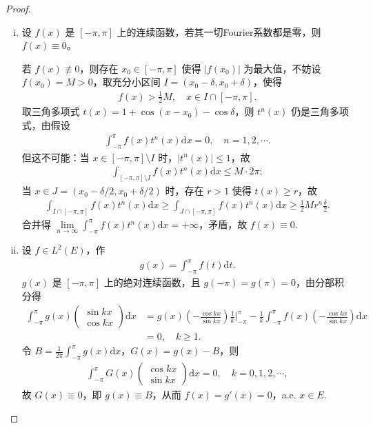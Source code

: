 \documentclass[../../main.tex]{subfiles}%
\begin{document}
\begin{proof}
\begin{enumerate}[(i)]
\item 设 $f(x)$ 是 $[-\pi, \pi]$ 上的连续函数，若其一切Fourier系数都是零，则 $f(x) \equiv 0$。

若 $f(x) \not\equiv 0$，则存在 $x_0 \in [-\pi, \pi]$ 使得 $|f(x_0)|$ 为最大值，不妨设 $f(x_0) = M > 0$，取充分小区间 $I = (x_0 - \delta, x_0 + \delta)$，使得
\begin{align*}
f(x) > \frac{1}{2}M, \quad x \in I \cap [-\pi, \pi].
\end{align*}
取三角多项式 $t(x) = 1 + \cos(x - x_0) - \cos\delta$，则 $t^n(x)$ 仍是三角多项式，由假设
\begin{align*}
\int_{-\pi}^\pi f(x) t^n(x) \mathrm{d}x = 0, \quad n=1,2,\cdots.
\end{align*}
但这不可能：当 $x \in [-\pi, \pi] \setminus I$ 时，$|t^n(x)| \leqslant 1$，故
\begin{align*}
\int_{[-\pi, \pi] \setminus I} f(x) t^n(x) \mathrm{d}x \leqslant M \cdot 2\pi;
\end{align*}
当 $x \in J = (x_0 - \delta/2, x_0 + \delta/2)$ 时，存在 $r > 1$ 使得 $t(x) \geqslant r$，故
\begin{align*}
\int_{I \cap [-\pi, \pi]} f(x) t^n(x) \mathrm{d}x \geqslant \int_{J \cap [-\pi, \pi]} f(x) t^n(x) \mathrm{d}x \geqslant \frac{1}{2}M r^n \frac{\delta}{2}.
\end{align*}
合并得 $\lim\limits_{n \to \infty} \int_{-\pi}^\pi f(x) t^n(x) \mathrm{d}x = +\infty$，矛盾，故 $f(x) \equiv 0$.

\item 设 $f \in L^2(E)$，作
\begin{align*}
g(x) = \int_{-\pi}^x f(t) \mathrm{d}t.
\end{align*}
$g(x)$ 是 $[-\pi, \pi]$ 上的绝对连续函数，且 $g(-\pi) = g(\pi) = 0$，由分部积分得
\begin{align*}
\int_{-\pi}^\pi g(x) \begin{pmatrix} \sin kx \\ \cos kx \end{pmatrix} \mathrm{d}x &= g(x) \left( -\frac{\cos kx}{\sin kx} \right) \frac{1}{k} \bigg|_{-\pi}^\pi - \frac{1}{k} \int_{-\pi}^\pi f(x) \left( -\frac{\cos kx}{\sin kx} \right) \mathrm{d}x \\
&= 0, \quad k \geqslant 1.
\end{align*}
令 $B = \frac{1}{2\pi} \int_{-\pi}^\pi g(x) \mathrm{d}x$，$G(x) = g(x) - B$，则
\begin{align*}
\int_{-\pi}^\pi G(x) \begin{pmatrix} \cos kx \\ \sin kx \end{pmatrix} \mathrm{d}x = 0, \quad k=0,1,2,\cdots,
\end{align*}
故 $G(x) \equiv 0$，即 $g(x) \equiv B$，从而 $f(x) = g'(x) = 0$，a.e. $x \in E$.
\end{enumerate}

\end{proof}
\end{document}
